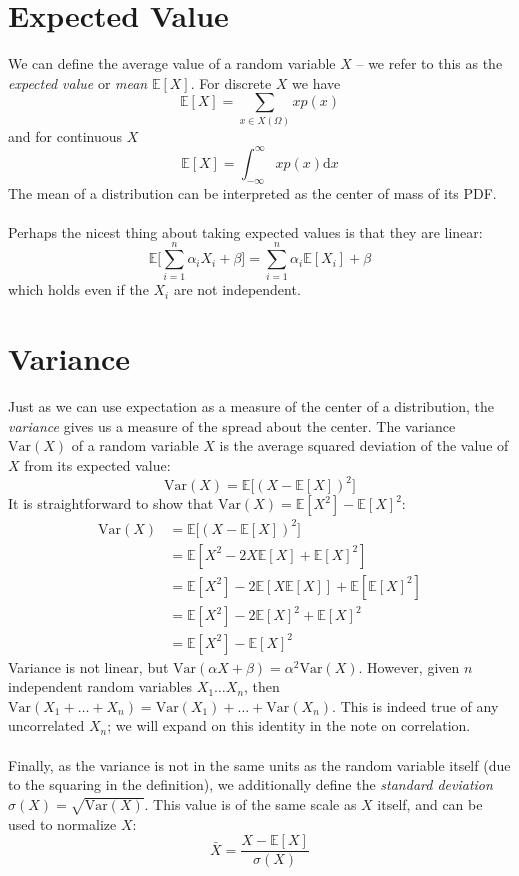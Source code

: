 \documentclass{article}
\begin{document}
\section{Expected Value}
We can define the average value of a random variable $X$ -- we refer to this as the \textit{expected value} or \textit{mean} $\mathbb{E}[X]$. For discrete $X$ we have $$\mathbb{E}[X] = \sum_{x \in X(\Omega)} xp(x)$$ and for continuous $X$ $$\mathbb{E}[X] = \int_{-\infty}^\infty xp(x)\text{d}x$$ The mean of a distribution can be interpreted as the center of mass of its PDF. \\\\
Perhaps the nicest thing about taking expected values is that they are linear: $$\mathbb{E}\big[\sum_{i=1}^n \alpha_iX_i + \beta\big] = \sum_{i=1}^n \alpha_i\mathbb{E}[X_i] + \beta$$ which holds even if the $X_i$ are not independent.

\section{Variance}
Just as we can use expectation as a measure of the center of a distribution, the \textit{variance} gives us a measure of the spread about the center. The variance $\text{Var}(X)$ of a random variable $X$ is the average squared deviation of the value of $X$ from its expected value: $$\text{Var}(X) = \mathbb{E}\big[(X - \mathbb{E}[X])^2\big]$$
It is straightforward to show that $\text{Var}(X) = \mathbb{E}[X^2] - \mathbb{E}[X]^2$:
\begin{align*}
\text{Var}(X) &= \mathbb{E}\big[(X - \mathbb{E}[X])^2\big] \\
&= \mathbb{E}[X^2 - 2X\mathbb{E}[X] + \mathbb{E}[X]^2] \\
&= \mathbb{E}[X^2] - 2\mathbb{E}[X\mathbb{E}[X]] + \mathbb{E}[\mathbb{E}[X]^2] \\
&= \mathbb{E}[X^2] - 2\mathbb{E}[X]^2 + \mathbb{E}[X]^2 \\
&= \mathbb{E}[X^2] - \mathbb{E}[X]^2
\end{align*}
Variance is not linear, but $\text{Var}(\alpha X + \beta) = \alpha^2 \text{Var}(X)$. However, given $n$ independent random variables $X_1 \hdots X_n$, then $\text{Var}(X_1 + \hdots + X_n) = \text{Var}(X_1) + \hdots + \text{Var}(X_n)$. This is indeed true of any uncorrelated $X_n$; we will expand on this identity in the note on correlation. \\\\
Finally, as the variance is not in the same units as the random variable itself (due to the squaring in the definition), we additionally define the \textit{standard deviation} $\sigma(X) = \sqrt{\text{Var}(X)}$. This value is of the same scale as $X$ itself, and can be used to normalize $X$: $$\bar{X} = \frac{X - \mathbb{E}[X]}{\sigma(X)}$$
\end{document}
